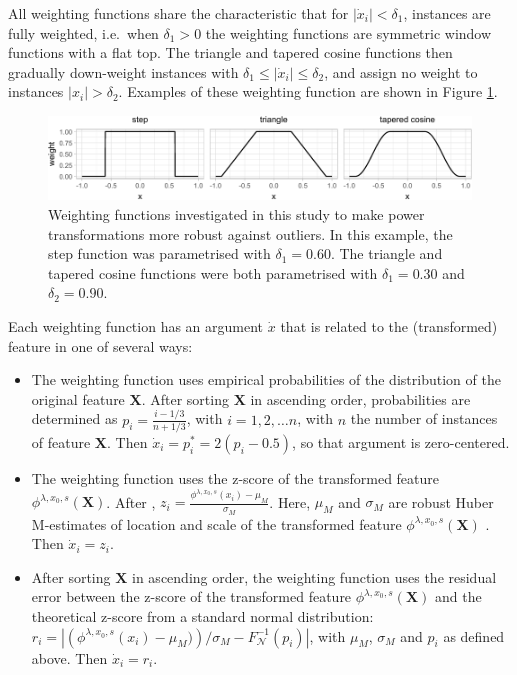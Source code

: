 \documentclass[preprint,12pt,authoryear]{elsarticle}
\begin{document}
All weighting functions share the characteristic that for
\(\left| \dot{x}_i \right|< \delta_1\), instances are fully weighted,
i.e.~when \(\delta_1 > 0\) the weighting functions are symmetric window
functions with a flat top. The triangle and tapered cosine functions
then gradually down-weight instances with
\(\delta_1 \leq \left| \dot{x}_i \right| \leq \delta_2\), and assign no
weight to instances \(\left| x_i \right| > \delta_2\). Examples of these
weighting function are shown in Figure \ref{fig:weighting-functions}.

\begin{figure}

{\centering \includegraphics[width=1\linewidth]{figure_2} 

}

\caption{Weighting functions investigated in this study to make power transformations more robust against outliers. In this example, the step function was parametrised with $\delta_1 = 0.60$. The triangle and tapered cosine functions were both parametrised with $\delta_1 = 0.30$ and $\delta_2 = 0.90$.}\label{fig:weighting-functions}
\end{figure}

Each weighting function has an argument \(\dot{x}\) that is related to
the (transformed) feature in one of several ways:

\begin{itemize}
\item
  The weighting function uses empirical probabilities of the
  distribution of the original feature \(\mathbf{X}\). After sorting
  \(\mathbf{X}\) in ascending order, probabilities are determined as
  \(p_i = \frac{i - 1/3}{n + 1/3}\), with \(i = 1, 2, \ldots n\), with
  \(n\) the number of instances of feature \(\mathbf{X}\). Then
  \(\dot{x}_i = p^{*}_i=2 \left( p_i - 0.5\right)\), so that argument is
  zero-centered.
\item
  The weighting function uses the z-score of the transformed feature
  \(\phi^{\lambda, x_0, s} (\mathbf{X})\). After \citep{Raymaekers2024-zf},
  \(z_i = \frac{\phi^{\lambda, x_0, s}(x_i) - \mu_M}{\sigma_M}\). Here,
  \(\mu_M\) and \(\sigma_M\) are robust Huber M-estimates of location
  and scale of the transformed feature
  \(\phi^{\lambda, x_0, s} (\mathbf{X})\) \citep{Huber1981-su}. Then
  \(\dot{x}_i = z_i\).
\item
  After sorting \(\mathbf{X}\) in ascending order, the weighting
  function uses the residual error between the z-score of the
  transformed feature \(\phi^{\lambda, x_0, s} (\mathbf{X})\) and the
  theoretical z-score from a standard normal distribution:
  \(r_i =\left| \left( \phi^{\lambda, x_0, s}(x_i) - \mu_M)\right) / \sigma_M - F^{-1}_{\mathcal{N}}(p_i) \right|\),
  with \(\mu_M\), \(\sigma_M\) and \(p_i\) as defined above. Then
  \(\dot{x}_i = r_i\).
\end{itemize}
\end{document}
